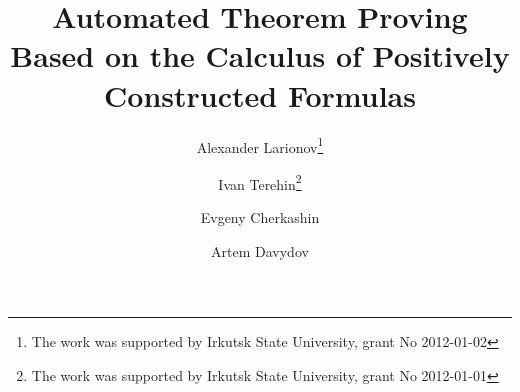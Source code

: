 \documentclass[runningheads,a4paper]{llncs}
\begin{document}
\newcommand{\fictAquantor}{\ensuremath{\forall\colon\boldsymbol{True}}}
\newcommand{\fictEquantor}{\ensuremath{\exists\colon\boldsymbol{True}}}
\newcommand{\bomega}{\boldsymbol{\omega}}
\newcommand{\bphi}{\boldsymbol{\phi}}
\newcommand{\eqdef}{\stackrel{\mathrm{df}}{=}}
\newcommand{\bigand}[2]{\raisebox{-4pt}{\ensuremath{\overset{#1}{\underset{#2}{\text{\huge\&\normalfont}}}}}}

\mainmatter  %

\title{Automated Theorem Proving Based on the Calculus of Positively Constructed Formulas}

\author{Alexander Larionov\thanks{The work was supported by Irkutsk State University, grant No 2012-01-02} \and Ivan Terehin\thanks{The work was supported by Irkutsk State University, grant No 2012-01-01} \and Evgeny Cherkashin \and Artem Davydov
}



%
%

\maketitle
\end{document}

